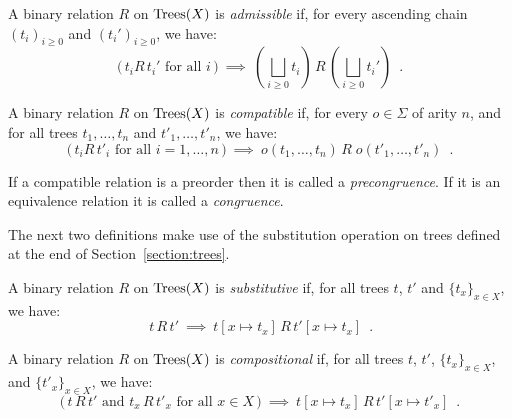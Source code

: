 

\begin{definition}[Admissibility]
    A binary relation $R$ on $\textnormal{Trees}(X)$ is \emph{admissible} if,
    for every ascending chain $(t_i)_{i \geq 0}$ and 
    $(t_i')_{i\geq 0}$, we have:
    \[ \text{($\,t_i  R \, t_i'$ for all $i\,$)} ~ \implies~
        \left(\bigsqcup_{i \geq 0} t_i\right) \, R \, \left(\bigsqcup_{i \geq 0} t_i'\right) \enspace .
    \]
\end{definition}

\begin{definition}[Compatibility]
    A binary relation $R$ on $\textnormal{Trees}(X)$ is  \emph{compatible} if,
    for every $o \in \Sigma$ of arity $n$, and for all trees 
     $t_1,\dots, t_n$ and $t'_1, \dots, t'_n$, we have:
    \[ \text{($\,t_i  R \, t'_i$ for all $i = 1, \dots, n\,$)} ~ \implies ~ 
        o(t_1, \dots, t_n) \, R \; o(t'_1, \dots, t'_n) \enspace .
    \]
\end{definition}
If a compatible relation is a preorder then it is called a \emph{precongruence}. If it is an equivalence relation it is called a \emph{congruence}.

\noindent
The next two definitions make use of the substitution operation on trees defined at the end of
Section~\ref{section:trees}.
\begin{definition}[Substitutive]
    A binary relation $R$ on $\textnormal{Trees}(X)$ is  \emph{substitutive} if,
    for all trees $t$, $t'$ and $\{t_x\}_{x \in X}$, we have:
    \[ \text{$\,t\, R \, t'$} ~ \implies ~ 
       t[ x \mapsto t_x] \, R \, t'[ x \mapsto t_x] \enspace .
    \]
\end{definition}



\begin{definition}[Compositionality]
    A binary relation $R$ on $\textnormal{Trees}(X)$ is \emph{compositional} if, for all 
    trees $t$, $t'$,  $\{t_x\}_{x \in X}$,  and $\{t'_x\}_{x \in X}$, we have:
        \[ \text{($\,t \, R \, t'$ and $t_x \, R \, t'_x$ for all $x \in X\,$)} ~ \implies ~ 
        t[ x \mapsto t_x] \, R \, t'[ x \mapsto t'_x] \enspace .
    \]
\end{definition}



